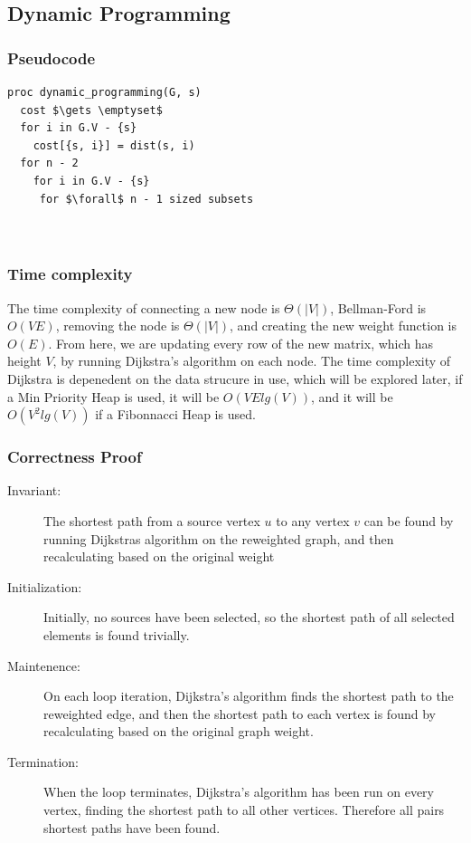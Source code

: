 \documentclass[a4paper,12pt]{article}
\begin{document}
\subsection{Dynamic Programming}
\subsubsection{Pseudocode}
\begin{lstlisting}[mathescape=true]
proc dynamic_programming(G, s)
  cost $\gets \emptyset$
  for i in G.V - {s}
    cost[{s, i}] = dist(s, i)
  for n - 2
    for i in G.V - {s}
     for $\forall$ n - 1 sized subsets
       
      
\end{lstlisting}
\subsubsection{Time complexity}
The time complexity of connecting a new node is $\Theta(|V|)$, Bellman-Ford is $O(VE)$, removing the node is $\Theta(|V|)$, and creating the new weight function is $O(E)$. From here, we are updating every row of the new matrix, which has height $V$, by running Dijkstra's algorithm on each node. The time complexity of Dijkstra is depenedent on the data strucure in use, which will be explored later, if a Min Priority Heap is used, it will be $O(VElg(V))$, and it will be $O(V^2lg(V))$ if a Fibonnacci Heap is used.
\subsubsection{Correctness Proof}
\begin{description}
\item [Invariant: ] The shortest path from a source vertex $u$ to any vertex $v$ can be found by running Dijkstras algorithm on the reweighted graph, and then recalculating based on the original weight
\item [Initialization: ] Initially, no sources have been selected, so the shortest path of all selected elements is found trivially.
\item [Maintenence: ] On each loop iteration, Dijkstra's algorithm finds the shortest path to the reweighted edge, and then the shortest path to each vertex is found by recalculating based on the original graph weight.
\item [Termination: ] When the loop terminates, Dijkstra's algorithm has been run on every vertex, finding the shortest path to all other vertices. Therefore all pairs shortest paths have been found.
\end{description}
\end{document}
